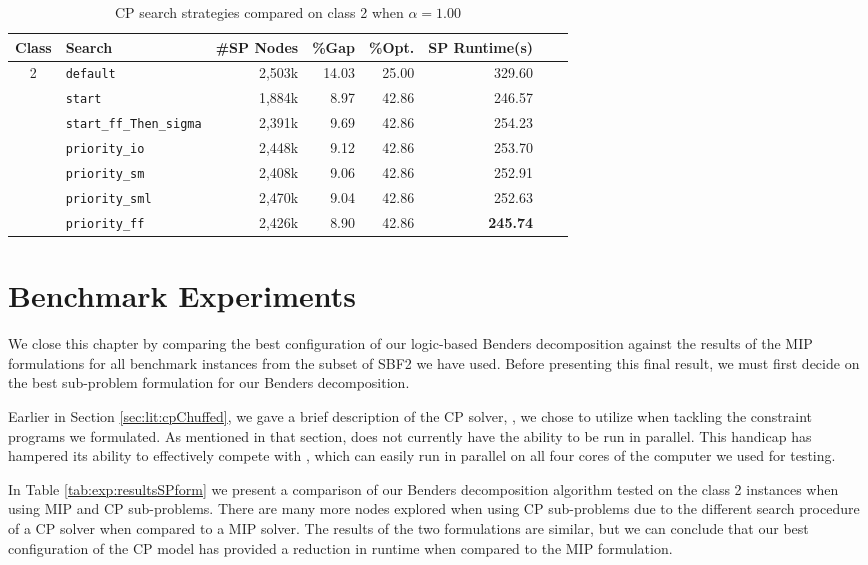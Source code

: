 \begin{table}[tpb]
	\caption{CP search strategies compared on class 2 when $\alpha=1.00$}
	\centering
	\vspace{2mm}
	\begin{tabular}{clrrrrrr}
		\toprule
		Class & Search & \#SP Nodes & \%Gap & \%Opt. & SP Runtime(s) \\\midrule\midrule
		2 & {\tt default}			& 2,503k & 14.03 & 25.00 & 329.60 \\
		 & {\tt start}				& 1,884k & 8.97 & 42.86 & 246.57 \\
		 & {\tt start\_ff\_Then\_sigma}	& 2,391k & 9.69 & 42.86 & 254.23 \\
		 & {\tt priority\_io}		& 2,448k & 9.12 & 42.86 & 253.70 \\
		 & {\tt priority\_sm}		& 2,408k & 9.06 & 42.86 & 252.91 \\
		 & {\tt priority\_sml}		& 2,470k & 9.04 & 42.86 & 252.63 \\
		 & {\tt priority\_ff}		& 2,426k & 8.90 & 42.86 & \bf{245.74} \\
		\bottomrule
	\end{tabular}
	\label{tab:exp:resultsCPsearch}
\end{table}

\section{Benchmark Experiments}
\label{sec:exp:benchmarkExp}
We close this chapter by comparing the best
configuration of our logic-based Benders decomposition
against the results of the MIP formulations for all benchmark
instances from the subset of SBF2 we have used.
Before presenting this final result, we must first
decide on the best sub-problem formulation for our
Benders decomposition.

Earlier in Section \ref{sec:lit:cpChuffed}, we gave a
brief description of the CP solver, \chuffed, we chose to utilize when
tackling the constraint programs we formulated.
As mentioned in that section, \chuffed does not currently have
the ability to be run in parallel.
This handicap has hampered its ability to effectively compete
with \gurobi, which can easily run in parallel on all four cores
of the computer we used for testing.

In Table \ref{tab:exp:resultsSPform} we present a comparison
of our Benders decomposition algorithm tested on the class 2
instances when using MIP and CP sub-problems.
There are many more nodes explored when using CP sub-problems
due to the different search procedure of a CP solver
when compared to a MIP solver.
The results of the two formulations are similar, but we can
conclude that our best configuration of the CP model
has provided a reduction in runtime when compared to the MIP
formulation.

